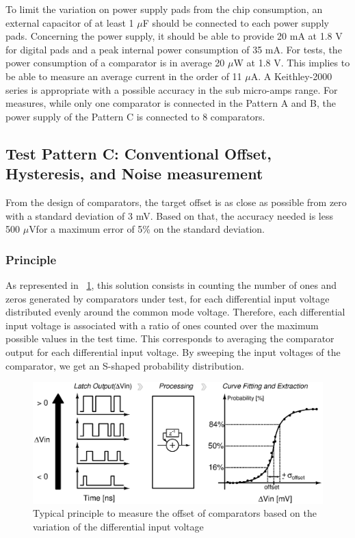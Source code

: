 To limit the variation on power supply pads from the chip consumption, an external capacitor of at least 1 $\mu$F should be connected to each power supply pads. Concerning the power supply, it should be able to provide 20 mA at 1.8 V for digital pads and a peak internal power consumption of 35 mA. For tests, the power consumption of a comparator is in average 20 $\mu$W at 1.8 V. This implies to be able to measure an average current in the order of 11 $\mu$A. A Keithley-2000 series is appropriate with a possible accuracy in the sub micro-amps range. For measures, while only one comparator is connected in the Pattern A and B, the power supply of the Pattern C is connected to 8 comparators.

\subsection{Test Pattern C: Conventional Offset, Hysteresis, and Noise measurement}
From the design of comparators, the target offset is as close as possible from zero with a standard deviation of 3 mV. Based on that, the accuracy needed is less 500 $\mu$V\footnotemark for a maximum error of 5\% on the standard deviation. 

\subsubsection{Principle}
As represented in \figurename~\ref{fig:conv_offset}, this solution consists in counting the number of ones and zeros generated by comparators under test, for each differential input voltage distributed evenly around the common mode voltage. Therefore, each differential input voltage is associated with a ratio of ones counted over the maximum possible values in the test time. This corresponds to averaging the comparator output for each differential input voltage. By sweeping the input voltages of the comparator, we get an S-shaped probability distribution.

\begin{figure}[htp]
    \centering
    \includegraphics[width=.8\textwidth]{Chapter5/Figs/comp_test/offset_conv_principle.ps}
    \caption{Typical principle to measure the offset of comparators based on the variation of the differential input voltage}
    \label{fig:conv_offset}
\end{figure}

